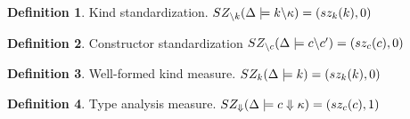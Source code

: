 \documentclass[12pt,twoside,fleqn]{amsart}
\theoremstyle{plain}
\theoremstyle{plain}
\theoremstyle{definition}
\newtheorem{defn}{Definition}
\begin{document}
\begin{defn}
Kind standardization. \( SZ_{\backslash k}(\Delta   \models k  \backslash \kappa   )=(sz_k(k),0) \)
\end{defn}
%

\begin{defn}
Constructor standardization \( SZ_{\backslash c}(\Delta   \models c  \backslash c'  )=(sz_{c}(c ),0) \) 
\end{defn}
%

\begin{defn}
Well-formed kind measure. \( SZ_k(\Delta   \models k )=(sz_k(k),0) \)
\end{defn}
%

\begin{defn}
Type analysis measure. \( SZ_{\Downarrow }(\Delta   \models c  \Downarrow \kappa   )=(sz_{c}(c ),1) \)
\end{defn}
%
\end{document}
